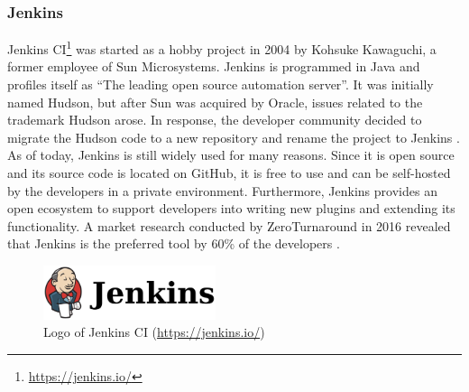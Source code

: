 
\subsubsection{Jenkins}
Jenkins CI\footnote{\url{https://jenkins.io/}} was started as a hobby project in 2004 by Kohsuke Kawaguchi, a former employee of Sun Microsystems. Jenkins is programmed in Java and profiles itself as ``The leading open source automation server''. It was initially named Hudson, but after Sun was acquired by Oracle, issues related to the trademark Hudson arose. In response, the developer community decided to migrate the Hudson code to a new repository and rename the project to Jenkins \cite{SmartJenkinsDefinitive}. As of today, Jenkins is still widely used for many reasons. Since it is open source and its source code is located on GitHub, it is free to use and can be self-hosted by the developers in a private environment. Furthermore, Jenkins provides an open ecosystem to support developers into writing new plugins and extending its functionality. A market research conducted by ZeroTurnaround in 2016 revealed that Jenkins is the preferred \CI{} tool by 60\% of the developers \cite{maple_2016}.

\begin{figure}[htbp!]
	\centering
	\includegraphics[width=0.45\textwidth]{assets/jenkins.pdf}
	\caption{Logo of Jenkins CI (\url{https://jenkins.io/})}
	\label{fig:jenkins}
\end{figure}